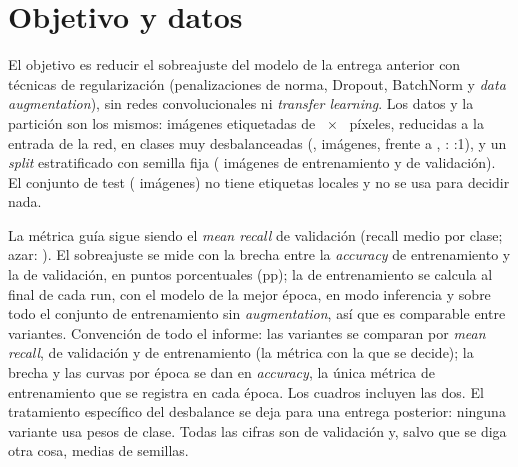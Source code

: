 \section{Objetivo y datos}
El objetivo es reducir el sobreajuste del modelo de la entrega anterior con técnicas de regularización
(penalizaciones de norma, Dropout, BatchNorm y \emph{data augmentation}), sin redes convolucionales ni
\emph{transfer learning}. Los datos y la partición son los mismos:  imágenes etiquetadas de
~$\times$~ píxeles, reducidas a la entrada de la red, en  clases muy
desbalanceadas (,  imágenes, frente a ,
: :1), y un \emph{split} estratificado con semilla fija (
imágenes de entrenamiento y  de validación). El conjunto de test ( imágenes) no tiene
etiquetas locales y no se usa para decidir nada.

La métrica guía sigue siendo el \emph{mean recall} de validación (recall medio por clase; azar:
). El sobreajuste se mide con la brecha entre la \emph{accuracy} de entrenamiento y la de
validación, en puntos porcentuales (pp); la de entrenamiento se calcula al final de cada run, con el modelo de la mejor
época, en modo inferencia y sobre todo el conjunto de entrenamiento sin \emph{augmentation}, así que es comparable
entre variantes. Convención de todo el informe: las variantes se comparan por \emph{mean recall}, de validación y de
entrenamiento (la métrica con la que se decide); la brecha y las curvas por época se dan en \emph{accuracy}, la
única métrica de entrenamiento que se registra en cada época. Los cuadros incluyen las dos. El tratamiento específico del desbalance se deja para una entrega posterior: ninguna variante usa
pesos de clase. Todas las cifras son de validación y, salvo que se diga otra cosa, medias de 
semillas.
